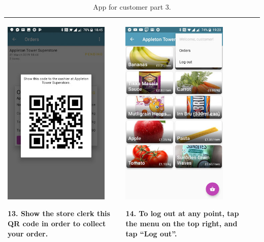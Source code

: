 \documentclass[onecolumn]{IEEEtran}
\begin{document}
\begin{table}[H]
  \centering
  \begin{tabular}{ | m{5.5cm} | m{5.5cm} | m{5.5cm} | }
    \hline
    \begin{minipage}{.31\textwidth}
      \includegraphics[width=\linewidth, height=90mm]{thirteen.jpg}
    \end{minipage}
    13. Show the store clerk this QR code in order to collect your order.
    &
    \begin{minipage}{.31\textwidth}
      \includegraphics[width=\linewidth, height=90mm]{fourteen.jpg}
    \end{minipage}
    14. To log out at any point, tap the menu on the top right, and tap “Log out”.
    &
    
    \\ \hline
  \end{tabular}
  \caption{App for customer part 3.}\label{tbl:myLboro}
\end{table}
\end{document}
